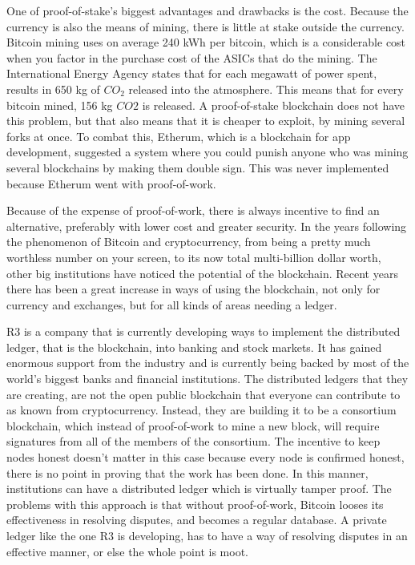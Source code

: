 \documentclass[12pt]{article}
\begin{document}
One of proof-of-stake's biggest advantages and drawbacks is the cost. Because the currency is also the means of mining, there is little at stake outside the currency. Bitcoin mining uses on average 240 kWh per bitcoin, which is a considerable cost when you factor in the purchase cost of the ASICs that do the mining. The International Energy Agency states that for each megawatt of power spent, results in 650 kg of $CO_2$ released into the atmosphere. This means that for every bitcoin mined, 156 kg $CO2$ is released. A proof-of-stake blockchain does not have this problem, but that also means that it is cheaper to exploit, by mining several forks at once. To combat this, Etherum, which is a blockchain for app development, suggested a system where you could punish anyone who was mining several blockchains by making them double sign. This was never implemented because Etherum went with proof-of-work. 

Because of the expense of proof-of-work, there is always incentive to find an alternative, preferably with lower cost and greater security. In the years following the phenomenon of Bitcoin and cryptocurrency, from being a pretty much worthless number on your screen, to its now total multi-billion dollar worth, other big institutions have noticed the potential of the blockchain. Recent years there has been a great increase in ways of using the blockchain, not only for currency and exchanges, but for all kinds of areas needing a ledger.

R3 is a company that is currently developing ways to implement the distributed ledger, that is the blockchain, into banking and stock markets. It has gained enormous support from the industry and is currently being backed by most of the world's biggest banks and financial institutions. The distributed ledgers that they are creating, are not the open public blockchain that everyone can contribute to as known from cryptocurrency. Instead, they are building it to be a consortium blockchain, which instead of proof-of-work to mine a new block, will require signatures from all of the members of the consortium. The incentive to keep nodes honest doesn't matter in this case because every node is confirmed honest, there is no point in proving that the work has been done. In this manner, institutions can have a distributed ledger which is virtually tamper proof. The problems with this approach is that without proof-of-work, Bitcoin looses its effectiveness in resolving disputes, and becomes a regular database. A private ledger like the one R3 is developing, has to have a way of resolving disputes in an effective manner, or else the whole point is moot. 
\end{document}

